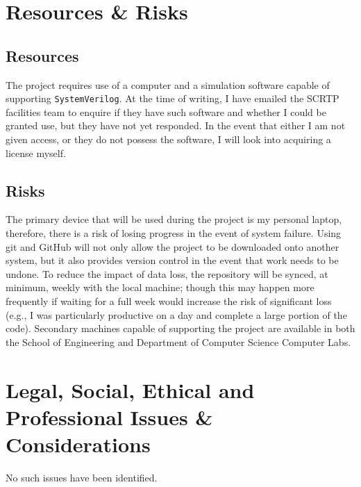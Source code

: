 \documentclass[12pt,a4paper]{article}
\begin{document}
\section{Resources \& Risks}
\subsection{Resources}
The project requires use of a computer and a simulation software capable of supporting \texttt{SystemVerilog}. At 
the time of writing, I have emailed the SCRTP facilities team to enquire if they have such software and whether I 
could be granted use, but they have not yet responded. In the event that either I am not given access, or they do 
not possess the software, I will look into acquiring a license myself.

\subsection{Risks}
The primary device that will be used during the project is my personal laptop, therefore, there is a risk of losing 
progress in the event of system failure. Using git and GitHub will not only allow the project to be downloaded onto 
another system, but it also provides version control in the event that work needs to be undone. To reduce the impact 
of data loss, the repository will be synced, at minimum, weekly with the local machine; though this may happen more 
frequently if waiting for a full week would increase the risk of significant loss (e.g., I was particularly 
productive on a day and complete a large portion of the code). Secondary machines capable of supporting the project 
are available in both the School of Engineering and Department of Computer Science Computer Labs.


\section{Legal, Social, Ethical and Professional Issues \& Considerations}
No such issues have been identified.


% 
% 
\end{document}
